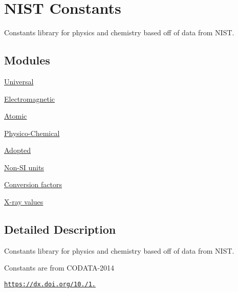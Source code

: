 \hypertarget{group___n_i_s_t_const}{}\section{N\+I\+ST Constants}
\label{group___n_i_s_t_const}


Constants library for physics and chemistry based off of data from N\+I\+ST.  


\subsection*{Modules}
\begin{DoxyCompactItemize}
\item 
\hyperlink{group___universal}{Universal}
\item 
\hyperlink{group___electromagnetic}{Electromagnetic}
\item 
\hyperlink{group___atomic}{Atomic}
\item 
\hyperlink{group___physico_chemical}{Physico-\/\+Chemical}
\item 
\hyperlink{group___adopted}{Adopted}
\item 
\hyperlink{group___non-_s_i}{Non-\/\+S\+I units}
\item 
\hyperlink{group___conversion_factors}{Conversion factors}
\item 
\hyperlink{group___x-ray}{X-\/ray values}
\end{DoxyCompactItemize}


\subsection{Detailed Description}
Constants library for physics and chemistry based off of data from N\+I\+ST. 

Constants are from C\+O\+D\+A\+T\+A-\/2014

\href{https://dx.doi.org/10.1063/1.4954402}{\tt https\+://dx.\+doi.\+org/10./1.} 